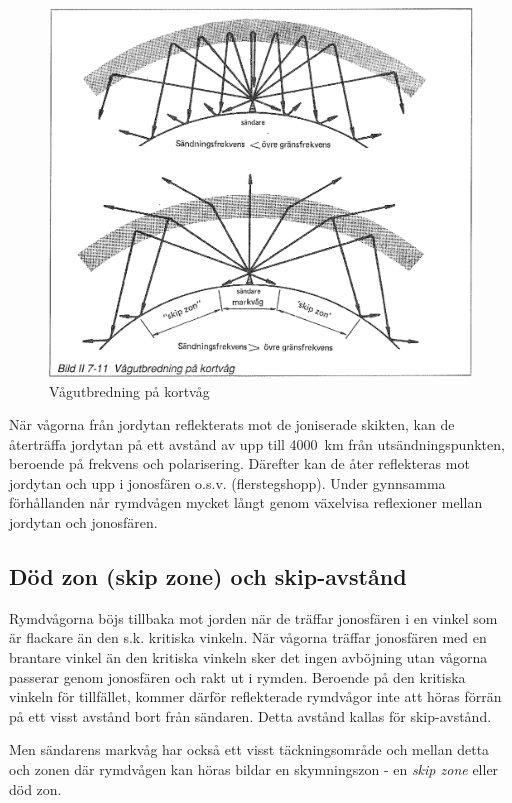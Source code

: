 \begin{figure}
  \includegraphics[width=\textwidth]{images/bild_2_7-11}
  \caption{Vågutbredning på kortvåg}
  \label{fig:bildII7-11}
\end{figure}

När vågorna från jordytan reflekterats mot de joniserade skikten, kan
de återträffa jordytan på ett avstånd av upp till 4000~km från
utsändningspunkten, beroende på frekvens och polarisering. Därefter
kan de åter reflekteras mot jordytan och upp i jonosfären
o.s.v. (flerstegshopp). Under gynnsamma förhållanden når rymdvågen
mycket långt genom växelvisa reflexioner mellan jordytan och
jonosfären.

\subsection{Död zon (skip zone) och skip-avstånd}

Rymdvågorna böjs tillbaka mot jorden när de träffar jonosfären i en
vinkel som är flackare än den s.k. kritiska vinkeln. När vågorna
träffar jonosfären med en brantare vinkel än den kritiska vinkeln sker
det ingen avböjning utan vågorna passerar genom jonosfären och rakt ut
i rymden. Beroende på den kritiska vinkeln för tillfället, kommer
därför reflekterade rymdvågor inte att höras förrän på ett visst
avstånd bort från sändaren. Detta avstånd kallas för skip-avstånd.

Men sändarens markvåg har också ett visst täckningsområde och mellan
detta och zonen där rymdvågen kan höras bildar en skymningszon - en
\emph{skip zone} eller död zon.

